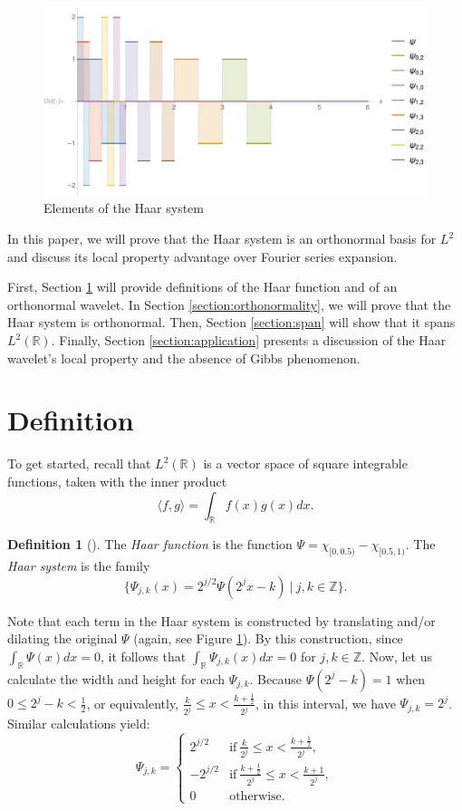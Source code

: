 \documentclass[11pt]{amsart}
\theoremstyle{theorem} %
\theoremstyle{definition}
\newtheorem{defn}[thm]{Definition}
\theoremstyle{example}
\theoremstyle{remark}
\numberwithin{equation}{section}
\newcommand{\R}{\mathbb{R}}
\newcommand{\Z}{\mathbb{Z}}
\begin{document}
\begin{figure}[h]
	\centering
	\includegraphics[width=0.7\linewidth]{img/haar_system2}
	\caption[Elements of the Haar system]{Elements of the Haar system}
	\label{fig:haarsystem}
\end{figure}

In this paper, we will prove that the Haar system is an orthonormal basis for $ L^2 $ and discuss its local property advantage over Fourier series expansion.

First, Section \ref{section:def} will provide definitions of the Haar function and of an orthonormal wavelet. In Section \ref{section:orthonormality}, we will prove that the Haar system is orthonormal. Then, Section \ref{section:span} will show that it spans $ L^2(\R) $. Finally, Section \ref{section:application} presents a discussion of the Haar wavelet's local property and the absence of Gibbs phenomenon.

\section{Definition} \label{section:def}
To get started, recall that \emph{$ L^2(\R) $} is a vector space of square integrable functions, taken with the inner product
\[ \langle f,g \rangle = \int_{\R} f(x) g(x)  dx. \]

\begin{defn}[{\cite[515]{davidson}}] \label{haar}
	The \emph{Haar function} is the function $ \varPsi = \chi_{[0,0.5)} - \chi_{[0.5,1)} $. The \emph{Haar system} is the family
	\[ \{ \varPsi_{j,k}(x) = 2^{j/2} \varPsi (2^j x-k) \ | \ j,k \in \Z \}. \]
\end{defn}

	Note that each term in the Haar system is constructed by translating and/or dilating the original $ \varPsi $ (again, see Figure \ref{fig:haarsystem}). By this construction, since $ \int_{\R} \varPsi(x)dx = 0 $, it follows that $ \int_{\R} \varPsi_{j,k}(x)dx = 0 $ for $ j,k \in \Z $.
	Now, let us calculate the width and height for each $ \varPsi_{j,k} $. Because $ \varPsi(2^j - k) = 1 $ when $ 0 \leq 2^j - k < \frac{1}{2} $, or equivalently, $ \frac{k}{2^j} \leq x < \frac{k+\frac{1}{2}}{2^j} $, in this interval, we have $ \varPsi_{j,k} = 2^j $.	
	Similar calculations yield:
	\begin{equation} \label{eq:height}
		\varPsi_{j,k} = 
		\begin{cases}
		2^{j/2} &\text{if}\ \frac{k}{2^j} \leq x < \frac{k+\frac{1}{2}}{2^j}, \\
		-2^{j/2} &\text{if}\ \frac{k+\frac{1}{2}}{2^j} \leq x < \frac{k+1}{2^j}, \\
		0 &\text{otherwise}.
		\end{cases}
	\end{equation}
	
\end{document}
